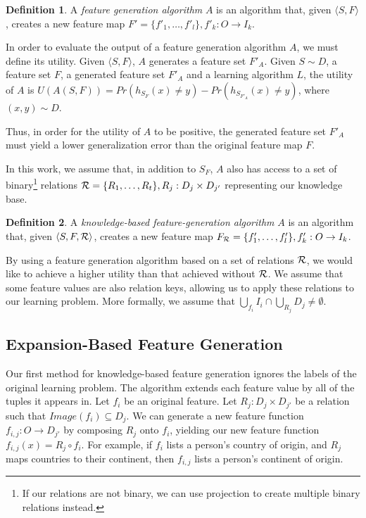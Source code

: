 \documentclass[twoside,11pt]{article}
\theoremstyle{definition}
\newtheorem{defn}{Definition}[section]
\begin{document}
\begin{defn}
	A \emph{feature generation algorithm} $A$ is an algorithm that, given $\langle S,F\rangle$, creates a new feature map $F'=\{f'_{1},\ldots,f'_{l}\}, f'_{k}:O\rightarrow I_k$.
\end{defn}

In order to evaluate the output of a feature generation algorithm $A$, we must define its utility. Given $\langle S,F \rangle$, $A$ generates a feature set $F'_A$.
Given $S\sim D$, a feature set $F$, a generated feature set $F'_A$ and a learning algorithm $L$, the utility of $A$ is $U(A(S,F))=Pr(h_{S_F}(x)\neq y)-Pr(h_{S_{F'_A}}(x)\neq y)$, where $(x,y)\sim D$.

Thus, in order for the utility of $A$ to be positive, the generated feature set $F'_A$ must yield a lower generalization error than the original feature map $F$.

In this work, we assume that, in addition to $S_F$, $A$ also has access to a set of binary\footnote{If our relations are not binary, we can use projection to create multiple binary relations instead.} relations ${\cal R}=\{R_{1},\ldots,R_{t}\}, R_j:D_j\times D_{j'}$ representing our knowledge base. 
\begin{defn}
	A \emph{knowledge-based feature-generation algorithm} $A$ is an algorithm that, given $\langle S,F,{\cal R} \rangle$, creates a new feature map $F_{{\cal R}}=\{f'_{1},\ldots,f'_{l}\}, f'_{k}:O\rightarrow I_k$.
\end{defn}

By using a feature generation algorithm based on a set of relations ${\cal R}$, we would like to achieve a higher utility than that achieved without ${\cal R}$. We assume that some feature values are also relation keys, allowing us to apply these relations to our learning problem. More formally, we assume that
 $\bigcup_{f_i} I_i \cap \bigcup_{R_j} D_j \neq \emptyset$. 

\subsection{Expansion-Based Feature Generation} \label{shallow_section}

Our first method for knowledge-based feature generation ignores the labels of the original learning problem.
The algorithm extends each feature value by all of the tuples it appears in.
Let $f_i$ be an original feature. Let $R_j:D_j\times D_{j'}$ be a relation such that  $Image(f_i) \subseteq D_j$. We can generate a new feature function $f_{i,j}:O\rightarrow D_{j'}$ by composing $R_j$ onto $f_i$, yielding our new feature function  $f_{i,j}(x)=R_j\circ f_i$. For example, if $f_i$ lists a person's country of origin, and $R_j$ maps countries to their continent, then $f_{i,j}$ lists a person's continent of origin.
\end{document}
